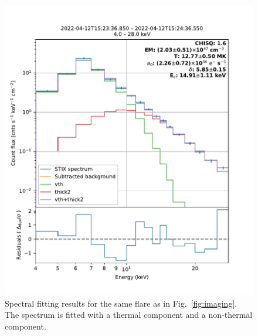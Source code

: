 \documentclass[referee]{preaa} %
\begin{document}
\begin{figure}[h]
  \centering
  \includegraphics[width=0.95\linewidth]{figures/ospex.pdf} %
  \caption{Spectral fitting results for the same flare as in Fig.~\ref{fig:imaging}. The spectrum is fitted with a thermal component and a non-thermal component.}
  \label{fig:ospex}
\end{figure}
\end{document}
